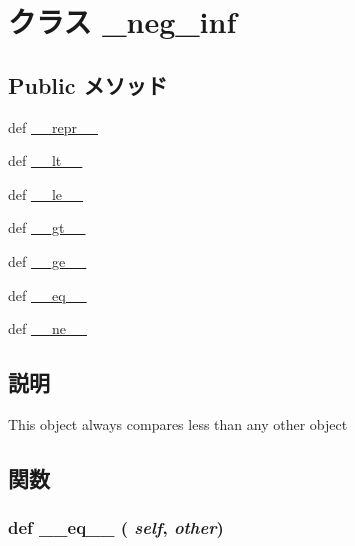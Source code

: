 \hypertarget{classm5_1_1util_1_1region_1_1__neg__inf}{
\section{クラス \_\-neg\_\-inf}
\label{classm5_1_1util_1_1region_1_1__neg__inf}
}
\subsection*{Public メソッド}
\begin{DoxyCompactItemize}
\item 
def \hyperlink{classm5_1_1util_1_1region_1_1__neg__inf_ad8b9328939df072e4740cd9a63189744}{\_\-\_\-repr\_\-\_\-}
\item 
def \hyperlink{classm5_1_1util_1_1region_1_1__neg__inf_a6a45920abc8ecf2d458d174ea7304f8a}{\_\-\_\-lt\_\-\_\-}
\item 
def \hyperlink{classm5_1_1util_1_1region_1_1__neg__inf_a83166e4aabc2805e71aef3a43f016181}{\_\-\_\-le\_\-\_\-}
\item 
def \hyperlink{classm5_1_1util_1_1region_1_1__neg__inf_a728aec3eafa75fd847ce0bf8f954efde}{\_\-\_\-gt\_\-\_\-}
\item 
def \hyperlink{classm5_1_1util_1_1region_1_1__neg__inf_a3ee81c22a31860655ba6bf83ff5a8f36}{\_\-\_\-ge\_\-\_\-}
\item 
def \hyperlink{classm5_1_1util_1_1region_1_1__neg__inf_a449f8fd74d358c0ad641b6c6d6917ba0}{\_\-\_\-eq\_\-\_\-}
\item 
def \hyperlink{classm5_1_1util_1_1region_1_1__neg__inf_ad69df72a6bf0be3525fe45cd2f77f343}{\_\-\_\-ne\_\-\_\-}
\end{DoxyCompactItemize}


\subsection{説明}
\begin{DoxyVerb}This object always compares less than any other object\end{DoxyVerb}
 

\subsection{関数}
\hypertarget{classm5_1_1util_1_1region_1_1__neg__inf_a449f8fd74d358c0ad641b6c6d6917ba0}{
\subsubsection[{\_\-\_\-eq\_\-\_\-}]{\setlength{\rightskip}{0pt plus 5cm}def \_\-\_\-eq\_\-\_\- ( {\em self}, \/   {\em other})}}
\label{classm5_1_1util_1_1region_1_1__neg__inf_a449f8fd74d358c0ad641b6c6d6917ba0}



